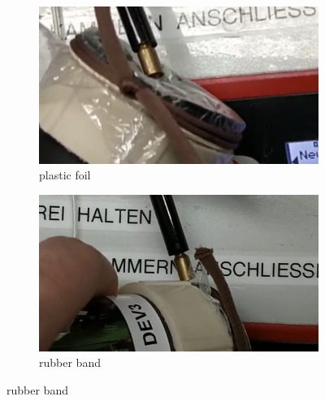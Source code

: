 \begin{figure}[ht]
	\centering
	
	\begin{subfigure}[b]{0.4\textwidth}
		\includegraphics[width=\textwidth]{./Chapters/CRT-handling/plastic_foil}
		\caption{plastic foil}
	\end{subfigure}
	\hspace{0.1\textwidth}
	\begin{subfigure}[b]{0.4\textwidth}
		\includegraphics[width=\textwidth]{./Chapters/CRT-handling/rubber_band}
		\caption{rubber band}
	\end{subfigure}

	\vspace{1cm}
	

\end{figure}
